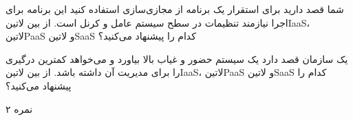 \documentclass[../main.tex]{subfiles}
\begin{document}

شما قصد دارید برای استقرار یک برنامه از مجازی‌سازی استفاده کنید این برنامه برای اجرا نیازمند تنظیمات در سطح سیستم عامل و کرنل است.
از بین ‌لاتین{IaaS}، ‌لاتین{PaaS} و ‌لاتین{SaaS} کدام را پیشنهاد می‌کنید؟

یک سازمان قصد دارد یک سیستم حضور و غیاب بالا بیاورد و می‌خواهد کمترین درگیری را برای مدیریت آن داشته باشد.
از بین ‌لاتین{IaaS}، ‌لاتین{PaaS} و ‌لاتین{SaaS} کدام را پیشنهاد می‌کنید؟

۲ نمره
\end{document}
